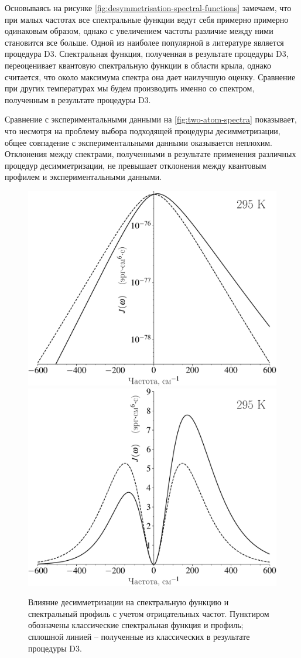 Основываясь на рисунке \ref{fig:desymmetrisation-spectral-functions} замечаем, что при малых частотах все спектральные функции ведут себя примерно примерно одинаковым образом, однако с увеличением частоты различие между ними становится все больше. Одной из наиболее популярной в литературе является процедура D3. Спектральная функция, полученная в результате процедуры D3, переоценивает квантовую спектральную функции в области крыла, однако считается, что около максимума спектра она дает наилучшую оценку. Сравнение при других температурах мы будем производить именно со спектром, полученным в результате процедуры D3. \par
Сравнение с экспериментальными данными на \ref{fig:two-atom-spectra} показывает, что несмотря на проблему выбора подходящей процедуры десимметризации, общее совпадение с экспериментальными данными оказывается неплохим. Отклонения между спектрами, полученными в результате применения различных процедур десимметризации, не превышает отклонения между квантовым профилем и экспериментальными данными.  

\begin{figure}[H]
    \centering
    \includegraphics[width=0.49\linewidth]{./pictures/two_atom_spectra/spectral_function_d3-crop.pdf}
    \includegraphics[width=0.49\linewidth]{./pictures/two_atom_spectra/spectrum_effect_d3-crop.pdf}
    \caption{Влияние десимметризации на спектральную функцию и спектральный профиль с учетом отрицательных частот. Пунктиром обозначены классические спектральная функция и профиль; сплошной линией -- полученные из классических в результате процедуры D3.}
\end{figure}


